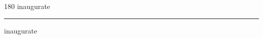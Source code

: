 
\begin{frame}
\begin{center}
\begin{turn}{180}
{\fontsize{2.5cm}{1em}\selectfont inaugurate}
\end{turn}
\vspace{1em}\par  
\hrule
\vspace{1em}\par  
{\fontsize{2.5cm}{1em}\selectfont inaugurate}
\end{center}
\end{frame}
